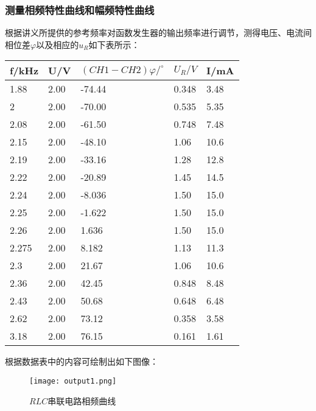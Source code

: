 \documentclass[UTF-8,twoside,cs4size]{ctexart}
\begin{document}
        \subsubsection{测量相频特性曲线和幅频特性曲线}
            根据讲义所提供的参考频率对函数发生器的输出频率进行调节，测得电压、电流间相位差$\varphi$以及相应的$u_R$如下表所示：\\
            \begin{table}[!h]
                \centering
                \begin{tabular}{|l|l|l|l|l|}
                \hline
                    f/kHz & U/V & $(CH1-CH2) \varphi/^{\circ}$ & $U_R/V$ & I/mA \\ \hline
                    1.88 & 2.00 & -74.44 & 0.348 & 3.48 \\ \hline
                    2 & 2.00 & -70.00 & 0.535 & 5.35 \\ \hline
                    2.08 & 2.00 & -61.50 & 0.748 & 7.48 \\ \hline
                    2.15 & 2.00 & -48.10 & 1.06 & 10.6 \\ \hline
                    2.19 & 2.00 & -33.16 & 1.28 & 12.8 \\ \hline
                    2.22 & 2.00 & -20.89 & 1.45 & 14.5 \\ \hline
                    2.24 & 2.00 & -8.036 & 1.50 & 15.0 \\ \hline
                    2.25 & 2.00 & -1.622 & 1.50 & 15.0 \\ \hline
                    2.26 & 2.00 & 1.636 & 1.50 & 15.0 \\ \hline
                    2.275 & 2.00 & 8.182 & 1.13 & 11.3 \\ \hline
                    2.3 & 2.00 & 21.67 & 1.06 & 10.6 \\ \hline
                    2.36 & 2.00 & 42.45 & 0.848 & 8.48 \\ \hline
                    2.43 & 2.00 & 50.68 & 0.648 & 6.48 \\ \hline
                    2.62 & 2.00 & 73.12 & 0.358 & 3.58 \\ \hline
                    3.18 & 2.00 & 76.15 & 0.161 & 1.61 \\ \hline
                \end{tabular}
            \end{table}
        
            根据数据表中的内容可绘制出如下图像：
        \begin{figure}[!h]
            \centering
            \texttt{[image: output1.png]}
            \caption{$ RLC $串联电路相频曲线}
        \end{figure}
\end{document}
